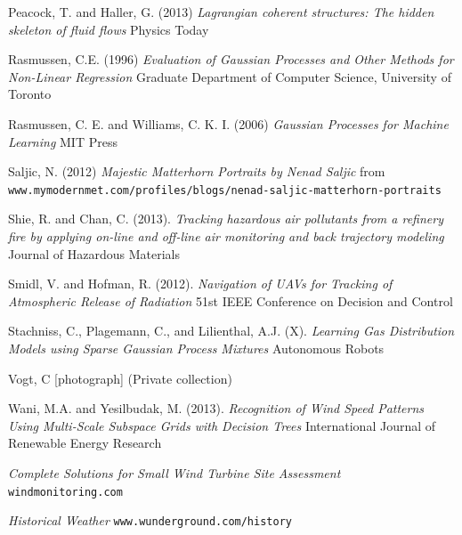 \documentclass[12pt]{report}
\begin{document}
\begin{thebibliography}{10}
	Peacock, T. and Haller, G. (2013) \emph{Lagrangian coherent structures: The hidden skeleton of fluid flows} Physics Today

	Rasmussen, C.E. (1996) \emph{Evaluation of Gaussian Processes and Other Methods for Non-Linear Regression} Graduate Department of Computer Science, University of Toronto

	Rasmussen, C. E. and Williams, C. K. I. (2006) \emph{Gaussian Processes for Machine Learning} MIT Press
	
	Saljic, N. (2012) \emph{Majestic Matterhorn Portraits by Nenad Saljic} from \texttt{www.mymodernmet.com/profiles/blogs/nenad-saljic-matterhorn-portraits}
	
	Shie, R. and Chan, C. (2013). \emph{Tracking hazardous air pollutants from a refinery fire by applying on-line and off-line air monitoring and back trajectory modeling} Journal of Hazardous Materials	
	
	Smidl, V. and Hofman, R. (2012). \emph{Navigation of UAVs for Tracking of Atmospheric Release of Radiation} 51st IEEE Conference on Decision and Control	
	
	Stachniss, C., Plagemann, C., and Lilienthal, A.J. (X). \emph{Learning Gas Distribution Models using Sparse Gaussian Process Mixtures} Autonomous Robots
	
	Vogt, C [photograph] (Private collection)

	Wani, M.A. and Yesilbudak, M. (2013). \emph{Recognition of Wind Speed Patterns Using Multi-Scale Subspace Grids with Decision Trees} International Journal of Renewable Energy Research

\emph{Complete Solutions for Small Wind Turbine Site Assessment} \texttt{windmonitoring.com}

\emph{Historical Weather} \texttt{www.wunderground.com/history}

\end{thebibliography}
\end{document}
